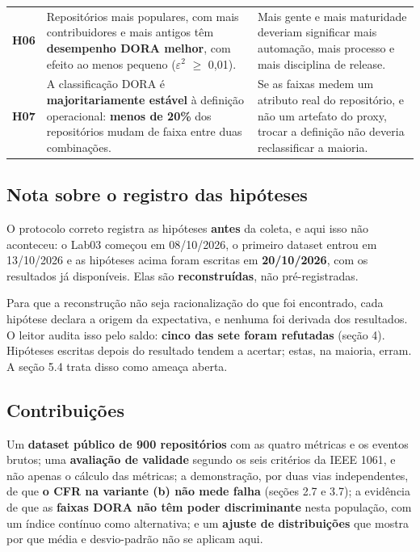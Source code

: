 \documentclass[12pt]{article}
\begin{document}
\begin{table}[!htbp]
\begin{tabular}{p{}p{}p{}}
\textbf{H06} & Repositórios mais populares, com mais contribuidores e mais antigos têm \textbf{desempenho DORA melhor}, com efeito ao menos pequeno ($\varepsilon$$^2$ $\geq$ 0,01). & Mais gente e mais maturidade deveriam significar mais automação, mais processo e mais disciplina de release. \\
\textbf{H07} & A classificação DORA é \textbf{majoritariamente estável} à definição operacional: \textbf{menos de 20\%} dos repositórios mudam de faixa entre duas combinações. & Se as faixas medem um atributo real do repositório, e não um artefato do proxy, trocar a definição não deveria reclassificar a maioria. \\
\bottomrule
\end{tabular}
\end{table}

\subsection{Nota sobre o registro das hipóteses}

O protocolo correto registra as hipóteses \textbf{antes} da coleta, e aqui isso não aconteceu: o Lab03 começou em 08/10/2026, o primeiro dataset entrou em 13/10/2026 e as hipóteses acima foram escritas em \textbf{20/10/2026}, com os resultados já disponíveis. Elas são \textbf{reconstruídas}, não pré-registradas.

Para que a reconstrução não seja racionalização do que foi encontrado, cada hipótese declara a origem da expectativa, e nenhuma foi derivada dos resultados. O leitor audita isso pelo saldo: \textbf{cinco das sete foram refutadas} (seção 4). Hipóteses escritas depois do resultado tendem a acertar; estas, na maioria, erram. A seção 5.4 trata disso como ameaça aberta.

\subsection{Contribuições}

Um \textbf{dataset público de 900 repositórios} com as quatro métricas e os eventos brutos; uma \textbf{avaliação de validade} segundo os seis critérios da IEEE 1061, e não apenas o cálculo das métricas; a demonstração, por duas vias independentes, de que \textbf{o CFR na variante (b) não mede falha} (seções 2.7 e 3.7); a evidência de que as \textbf{faixas DORA não têm poder discriminante} nesta população, com um índice contínuo como alternativa; e um \textbf{ajuste de distribuições} que mostra por que média e desvio-padrão não se aplicam aqui.
\end{document}
